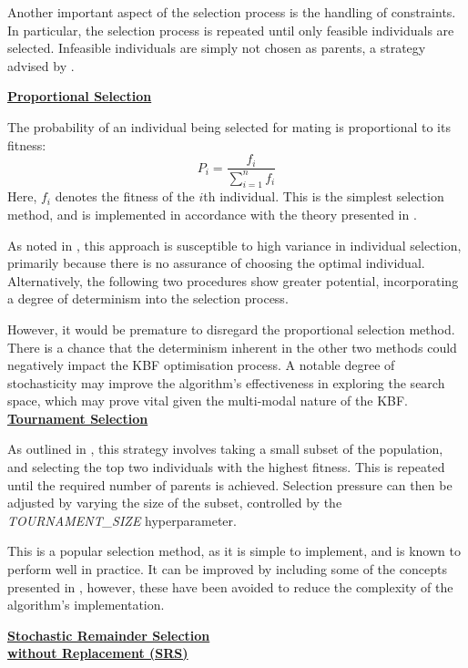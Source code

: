 \documentclass[10pt]{article}
\begin{document}
\begin{multicols}{2}
Another important aspect of the selection process is the handling of constraints. In particular, the selection process is repeated until only feasible individuals are selected. Infeasible individuals are simply not chosen as parents, a strategy advised by \cite{parks2023geneticalgorithms}. 

\textbf{\underline{Proportional Selection}}

The probability of an individual being selected for mating is proportional to its fitness:
\[
    P_i = \frac{f_i}{\sum_{i=1}^{n} f_i}
\]
Here, \(f_i\) denotes the fitness of the \(i\)th individual. This is the simplest selection method, and is implemented in accordance with the theory presented in \cite{parks2023geneticalgorithms}.

As noted in \cite{parks2023geneticalgorithms}, this approach is susceptible to high variance in individual selection, primarily because there is no assurance of choosing the optimal individual. Alternatively, the following two procedures show greater potential, incorporating a degree of determinism into the selection process.

However, it would be premature to disregard the proportional selection method. There is a chance that the determinism inherent in the other two methods could negatively impact the KBF optimisation process. A notable degree of stochasticity may improve the algorithm's effectiveness in exploring the search space, which may prove vital given the multi-modal nature of the KBF.
\textbf{\underline{Tournament Selection}}

As outlined in \cite{parks2023geneticalgorithms}, this strategy involves taking a small subset of the population, and selecting the top two individuals with the highest fitness. This is repeated until the required number of parents is achieved. Selection pressure can then be adjusted by varying the size of the subset, controlled by the \textit{TOURNAMENT\_SIZE} hyperparameter.

This is a popular selection method, as it is simple to implement, and is known to perform well in practice. It can be improved by including some of the concepts presented in \cite{Miller1995GeneticAT}, however, these have been avoided to reduce the complexity of the algorithm's implementation.

\textbf{\underline{Stochastic Remainder Selection}}\\\vspace{0.5mm}
\textbf{\underline{\hspace{-0.5mm}without Replacement (SRS)}}


\end{multicols}
\end{document}
